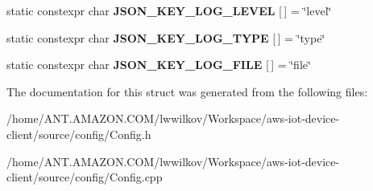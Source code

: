 \begin{DoxyCompactItemize}
static constexpr char {\bfseries J\+S\+O\+N\+\_\+\+K\+E\+Y\+\_\+\+L\+O\+G\+\_\+\+L\+E\+V\+EL} \mbox{[}$\,$\mbox{]} = \char`\"{}level\char`\"{}
\item 
\mbox{\label{struct_aws_1_1_iot_1_1_device_client_1_1_plain_config_1_1_log_config_a79a5c1c62a2f129fcfe1be00f71fba7d}} 
static constexpr char {\bfseries J\+S\+O\+N\+\_\+\+K\+E\+Y\+\_\+\+L\+O\+G\+\_\+\+T\+Y\+PE} \mbox{[}$\,$\mbox{]} = \char`\"{}type\char`\"{}
\item 
\mbox{\label{struct_aws_1_1_iot_1_1_device_client_1_1_plain_config_1_1_log_config_ab6a4e5f12c8858fa2c39941edabb7fc6}} 
static constexpr char {\bfseries J\+S\+O\+N\+\_\+\+K\+E\+Y\+\_\+\+L\+O\+G\+\_\+\+F\+I\+LE} \mbox{[}$\,$\mbox{]} = \char`\"{}file\char`\"{}
\end{DoxyCompactItemize}


The documentation for this struct was generated from the following files\+:\begin{DoxyCompactItemize}
\item 
/home/\+A\+N\+T.\+A\+M\+A\+Z\+O\+N.\+C\+O\+M/lwwilkov/\+Workspace/aws-\/iot-\/device-\/client/source/config/Config.\+h\item 
/home/\+A\+N\+T.\+A\+M\+A\+Z\+O\+N.\+C\+O\+M/lwwilkov/\+Workspace/aws-\/iot-\/device-\/client/source/config/Config.\+cpp\end{DoxyCompactItemize}
